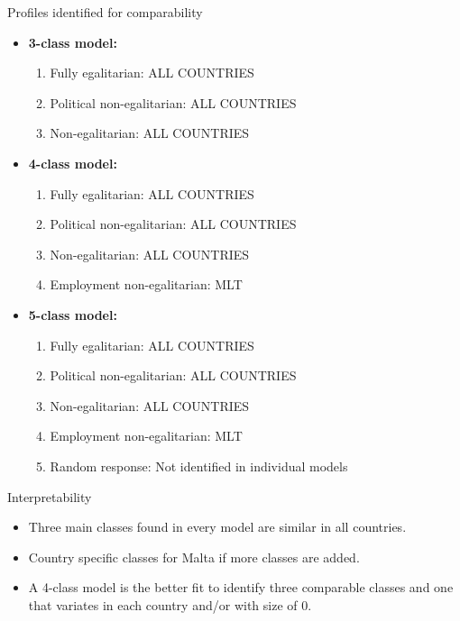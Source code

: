 \documentclass[11pt,t]{beamer}
\begin{document}
\begin{frame}[c,plain]{Profiles identified for comparability}
\begin{itemize}
\vspace{-3.1mm} 
\item \textbf{3-class model:} 

\begin{enumerate}
	\item Fully egalitarian: ALL COUNTRIES
	\item Political non-egalitarian: ALL COUNTRIES
	\item Non-egalitarian: ALL COUNTRIES
\end{enumerate}
\vspace{2mm} 

\item \textbf{4-class model:} 

\begin{enumerate}
	\item Fully egalitarian: ALL COUNTRIES
	\item Political non-egalitarian: ALL COUNTRIES
	\item Non-egalitarian: ALL COUNTRIES
	\item Employment non-egalitarian: MLT
\end{enumerate}
\vspace{2mm} 

\item \textbf{5-class model:}  
\begin{enumerate}
	\item Fully egalitarian: ALL COUNTRIES
	\item Political non-egalitarian: ALL COUNTRIES
	\item Non-egalitarian: ALL COUNTRIES
	\item Employment non-egalitarian: MLT
	\item Random response: Not identified in individual models
\end{enumerate}

\end{itemize}
\end{frame} 

\begin{frame}{Interpretability}
	
\begin{itemize}
\item Three main classes found in every model are similar in all countries.

\vspace{3.1mm} 
\item Country specific classes for Malta if more classes are added.

\vspace{3.1mm} 
\item A 4-class model is the better fit to identify three comparable classes and one that variates in each country and/or with size of 0.

\end{itemize}
\end{frame} 
\end{document}
